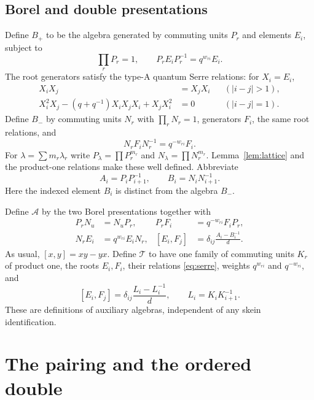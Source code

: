 \documentclass[11pt]{article}
\theoremstyle{definition}
\theoremstyle{remark}
\newcommand{\cA}{\mathcal{A}}
\newcommand{\cT}{\mathcal{T}}
\begin{document}
\subsection{Borel and double presentations}
Define $B_+$ to be the algebra generated by commuting units $P_r$ and elements $E_i$, subject to
\begin{equation}\label{eq:positive}
 \prod_rP_r=1,\qquad P_rE_iP_r^{-1}=q^{w_{ri}}E_i.
\end{equation}
The root generators satisfy the type-A quantum Serre relations: for $X_i=E_i$,
\begin{equation}\label{eq:serre}
 \begin{aligned}
 X_iX_j&=X_jX_i &&(|i-j|>1),\\
 X_i^2X_j-(q+q^{-1})X_iX_jX_i+X_jX_i^2&=0 &&(|i-j|=1).
 \end{aligned}
\end{equation}
Define $B_-$ by commuting units $N_r$ with $\prod_rN_r=1$, generators $F_i$, the same root relations, and
\begin{equation}\label{eq:negative}
 N_rF_iN_r^{-1}=q^{-w_{ri}}F_i.
\end{equation}
For $\lambda=\sum m_r\lambda_r$ write $P_\lambda=\prod P_r^{m_r}$ and $N_\lambda=\prod N_r^{m_r}$. Lemma~\ref{lem:lattice} and the product-one relations make these well defined. Abbreviate
\[
 A_i=P_iP_{i+1}^{-1},\qquad B_i=N_iN_{i+1}^{-1}.
\]
Here the indexed element $B_i$ is distinct from the algebra $B_-$.

Define $\cA$ by the two Borel presentations together with
\begin{equation}\label{eq:mixed}
 \begin{aligned}
 P_rN_u&=N_uP_r,& P_rF_i&=q^{-w_{ri}}F_iP_r,\\
 N_rE_i&=q^{w_{ri}}E_iN_r,&
 [E_i,F_j]&=\delta_{ij}\frac{A_i-B_i^{-1}}d.
 \end{aligned}
\end{equation}
As usual, $[x,y]=xy-yx$. Define $\cT$ to have one family of commuting units $K_r$ of product one, the roots $E_i,F_i$, their relations \eqref{eq:serre}, weights $q^{w_{ri}}$ and $q^{-w_{ri}}$, and
\begin{equation}\label{eq:single-commutator}
 [E_i,F_j]=\delta_{ij}\frac{L_i-L_i^{-1}}d,
 \qquad L_i=K_iK_{i+1}^{-1}.
\end{equation}
These are definitions of auxiliary algebras, independent of any skein identification.

\section{The pairing and the ordered double}\label{sec:double}
\end{document}
